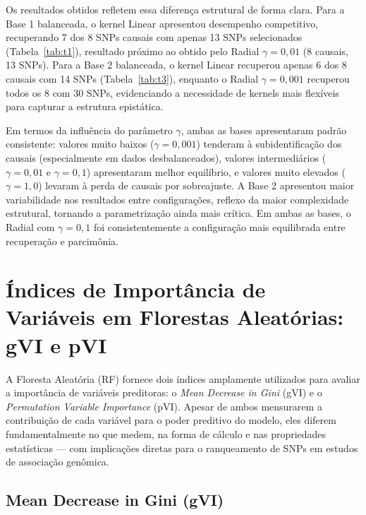 \documentclass[
    12pt,
    a4paper,
    oneside,
    english,
    french,
    spanish,
    brazil
    ]{abntex2}
\newcommand{\novo}[1]{\textcolor{corNova}{#1}}
\begin{document}
\novo{Os resultados obtidos refletem essa diferença estrutural de forma clara. Para a Base 1 balanceada, o kernel Linear apresentou desempenho competitivo, recuperando 7 dos 8 SNPs causais com apenas 13 SNPs selecionados (Tabela~\ref{tab:t1}), resultado próximo ao obtido pelo Radial $\gamma = 0{,}01$ (8 causais, 13 SNPs). Para a Base 2 balanceada, o kernel Linear recuperou apenas 6 dos 8 causais com 14 SNPs (Tabela~\ref{tab:t3}), enquanto o Radial $\gamma = 0{,}001$ recuperou todos os 8 com 30 SNPs, evidenciando a necessidade de kernels mais flexíveis para capturar a estrutura epistática.}

\novo{Em termos da influência do parâmetro $\gamma$, ambas as bases apresentaram padrão consistente: valores muito baixos ($\gamma = 0{,}001$) tenderam à subidentificação dos causais (especialmente em dados desbalanceados), valores intermediários ($\gamma = 0{,}01$ e $\gamma = 0{,}1$) apresentaram melhor equilíbrio, e valores muito elevados ($\gamma = 1{,}0$) levaram à perda de causais por sobreajuste. A Base 2 apresentou maior variabilidade nos resultados entre configurações, reflexo da maior complexidade estrutural, tornando a parametrização ainda mais crítica. Em ambas as bases, o Radial com $\gamma = 0{,}1$ foi consistentemente a configuração mais equilibrada entre recuperação e parcimônia.}

\chapter{Índices de Importância de Variáveis em Florestas Aleatórias: gVI e pVI}
\label{cap:gvi_pvi}

\novo{A Floresta Aleatória (RF) fornece dois índices amplamente utilizados para avaliar a importância de variáveis preditoras: o \textit{Mean Decrease in Gini} (gVI) e o \textit{Permutation Variable Importance} (pVI). Apesar de ambos mensurarem a contribuição de cada variável para o poder preditivo do modelo, eles diferem fundamentalmente no que medem, na forma de cálculo e nas propriedades estatísticas --- com implicações diretas para o ranqueamento de SNPs em estudos de associação genômica.}

\section*{Mean Decrease in Gini (gVI)}
\end{document}
